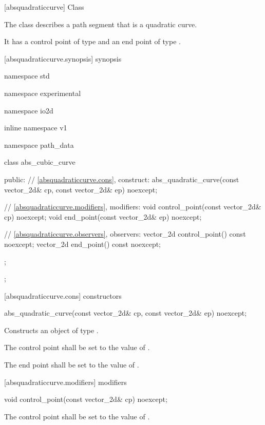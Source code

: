  [absquadraticcurve] {Class }

\pnum
{}
The class  describes a path segment that is a quadratic \bezierlocal curve.

\pnum
It has a control point of type  and an end point of type .

 [absquadraticcurve.synopsis] { synopsis}

\begin{codeblock}
namespace std { namespace experimental { namespace io2d { inline namespace v1 {
  namespace path_data {
    class abs_cubic_curve {
    public:
      // \ref{absquadraticcurve.cons}, construct:
      abs_quadratic_curve(const vector_2d& cp, const vector_2d& ep) noexcept;

      // \ref{absquadraticcurve.modifiers}, modifiers:
      void control_point(const vector_2d& cp) noexcept;
      void end_point(const vector_2d& ep) noexcept;

      // \ref{absquadraticcurve.observers}, observers:
      vector_2d control_point() const noexcept;
      vector_2d end_point() const noexcept;
    };
  };
} } } }
\end{codeblock}

 [absquadraticcurve.cons] { constructors}

\begin{itemdecl}
    abs_quadratic_curve(const vector_2d& cp, const vector_2d& ep) noexcept;
\end{itemdecl}
\begin{itemdescr}
	\pnum
	\effects
	Constructs an object of type .
	
	\pnum
	The control point shall be set to the value of .
	
	\pnum
	The end point shall be set to the value of .
\end{itemdescr}

 [absquadraticcurve.modifiers]{ modifiers}

\begin{itemdecl}
    void control_point(const vector_2d& cp) noexcept;
\end{itemdecl}
\begin{itemdescr}
	\pnum
	\effects
	The control point shall be set to the value of .
\end{itemdescr}

